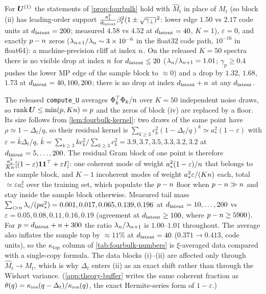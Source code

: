 \begin{remark}\label{rem:fourbulk-singlecopy}
For $\bm{U}^{(1)}$ the statements of \cref{prop:fourbulk} hold with $\hat M_t$ in place of $M_t$ (so block (ii) has leading-order support $\tfrac{a_1^2}{d_{\mathrm{latent}}}\beta_t^2(1\pm\sqrt{\gamma_\perp})^2$: lower edge $1.50$ vs $2.17$ code units at $d_{\mathrm{latent}}=200$; measured $4.58$ vs $4.52$ at $d_{\mathrm{latent}}=40$, $K=1$), $\varepsilon=0$, and exactly $p-n$ zeros ($\lambda_{n+1}/\lambda_n\sim3\times10^{-6}$ in the float32 code path, $10^{-16}$ in float64): a machine-precision cliff at index $n$. On the released $K=50$ spectra there is no visible drop at index $n$ for $d_{\mathrm{latent}}\le20$ ($\lambda_n/\lambda_{n+1}=1.01$; $\gamma_p\ge0.4$ pushes the lower MP edge of the sample block to $\approx0$) and a drop by $1.32$, $1.68$, $1.73$ at $d_{\mathrm{latent}}=40,100,200$; there is no drop at index $d_{\mathrm{latent}}+n$ at any $d_{\mathrm{latent}}$.
\end{remark}
The released \texttt{compute\_U} averages $\Phi_k^\top\Phi_k/n$ over $K=50$ independent noise draws, so $\operatorname{rank}\bm{U}\le\min(p,Kn)=p$ and the zeros of block (iv) are replaced by a floor. Its size follows from \cref{lem:fourbulk-kernel}: two draws of the same point have $\rho\simeq1-\Delta_t/q$, so their residual kernel is $\sum_{k\ge3}c_k^2(1-\Delta_t/q)^k\simeq a_*^2(1-\varepsilon)$ with $\varepsilon=\bar k\Delta_t/q$, $\bar k=\sum_{k\ge3}kc_k^2/\sum_{k\ge3}c_k^2=3.9,3.7,3.5,3.3,3.2,3.2$ at $d_{\mathrm{latent}}=5,\dots,200$. The residual Gram block of one point is therefore $\tfrac{a_*^2}{Kn}[(1-\varepsilon)\mathbf 1\mathbf 1^\top+\varepsilon I]$: one coherent mode of weight $a_*^2(1-\varepsilon)/n$ that belongs to the sample block, and $K-1$ incoherent modes of weight $a_*^2\varepsilon/(Kn)$ each, total $\simeq\varepsilon a_*^2$ over the training set, which populate the $p-n$ floor when $p-n\gg n$ and stay inside the sample block otherwise. Measured tail mass $\sum_{i>n}\lambda_i/(p a_*^2)=0.001,0.017,0.065,0.139,0.196$ at $d_{\mathrm{latent}}=10,\dots,200$ vs $\varepsilon=0.05,0.08,0.11,0.16,0.19$ (agreement at $d_{\mathrm{latent}}\ge100$, where $p-n\ge5900$). For $p=d_{\mathrm{latent}}+n+300$ the ratio $\lambda_n/\lambda_{n+1}$ is $1.00$--$1.01$ throughout. The average also inflates the sample top by $\approx11\%$ at $d_{\mathrm{latent}}=40$ ($0.371\to0.413$, code units), so the $\kappa_{\mathrm{top}}$ column of \cref{tab:fourbulk-numbers} is $\xi$-averaged data compared with a single-copy formula. The data blocks (i)--(ii) are affected only through $\hat M_t\to M_t$, which is why $\Delta_t$ enters (ii) as an exact shift rather than through the Wishart variance. (\cref{app:theory-buffer} writes the same coherent fraction as $\theta(q)=\kappa_{\rm res}(q-\Delta_t)/\kappa_{\rm res}(q)$, the exact Hermite-series form of $1-\varepsilon$.)


